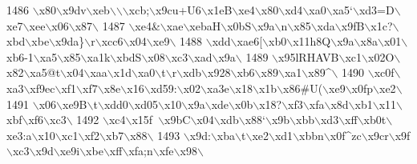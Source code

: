 \begin{DoxyCode}
{{1486 \textcolor{stringliteral}{\(\backslash\)x80\(\backslash\)x9dv\(\backslash\)xeb\(\backslash\)\(\backslash\)\(\backslash\)xcb;\(\backslash\)x9cu+U6\(\backslash\)x1eB\(\backslash\)xe4\(\backslash\)x80\(\backslash\)xd4\(\backslash\)xa0\(\backslash\)xa5`\(\backslash\)xd3=D\(\backslash\)xe7\(\backslash\)xee\(\backslash\)x06\(\backslash\)x87\(\backslash\)}
1487 \textcolor{stringliteral}{\(\backslash\)xe4&\(\backslash\)xae\(\backslash\)xebaH\(\backslash\)x0bS\(\backslash\)x9a\(\backslash\)n\(\backslash\)x85\(\backslash\)xda\(\backslash\)x9fB\(\backslash\)x1c?\(\backslash\)xbd\(\backslash\)xbe\(\backslash\)x9da\}\(\backslash\)r\(\backslash\)xcc6\(\backslash\)x04\(\backslash\)xe9\(\backslash\)}
1488 \textcolor{stringliteral}{\(\backslash\)xdd\(\backslash\)xae6[\(\backslash\)xb0\(\backslash\)x11h8Q\(\backslash\)x9a\(\backslash\)x8a\(\backslash\)x01\(\backslash\)xb6-1\(\backslash\)xa5\(\backslash\)x85\(\backslash\)xa1k\(\backslash\)xbdS\(\backslash\)x08\(\backslash\)xc3\(\backslash\)xad\(\backslash\)x9a\(\backslash\)}
1489 \textcolor{stringliteral}{\(\backslash\)x95lRHAVB\(\backslash\)xc1\(\backslash\)x02O\(\backslash\)x82\(\backslash\)xa5@t\(\backslash\)x04\(\backslash\)xaa\(\backslash\)x1d\(\backslash\)xa0\(\backslash\)t\(\backslash\)r\(\backslash\)xdb\(\backslash\)x928\(\backslash\)xb6\(\backslash\)x89\(\backslash\)xa1\(\backslash\)x89^\(\backslash\)}
1490 \textcolor{stringliteral}{\(\backslash\)xc0f\(\backslash\)xa3\(\backslash\)xf9ec\(\backslash\)xf1\(\backslash\)xf7\(\backslash\)x8e\(\backslash\)x16\(\backslash\)xd59:\(\backslash\)x02\(\backslash\)xa3e\(\backslash\)x18\(\backslash\)x1b\(\backslash\)x86#U(\(\backslash\)xe9\(\backslash\)x0fp\(\backslash\)xe2\(\backslash\)}
1491 \textcolor{stringliteral}{\(\backslash\)x06\(\backslash\)xe9B\(\backslash\)t\(\backslash\)xdd0\(\backslash\)xd05\(\backslash\)x10\(\backslash\)x9a\(\backslash\)xde\(\backslash\)x0b\(\backslash\)x18?\(\backslash\)xf3\(\backslash\)xfa\(\backslash\)x8d\(\backslash\)xb1\(\backslash\)x11\(\backslash\)xbf\(\backslash\)xf6\(\backslash\)xc3\(\backslash\)}
1492 \textcolor{stringliteral}{\(\backslash\)xc4\(\backslash\)x15f~\(\backslash\)x9bC\(\backslash\)x04\(\backslash\)xdb\(\backslash\)x88`\(\backslash\)x9b\(\backslash\)xbb\(\backslash\)xd3\(\backslash\)xff\(\backslash\)xb0t\(\backslash\)xe3:a\(\backslash\)x10\(\backslash\)xc1\(\backslash\)xf2\(\backslash\)xb7\(\backslash\)x88\(\backslash\)}
1493 \textcolor{stringliteral}{\(\backslash\)x9d:\(\backslash\)xba\(\backslash\)t\(\backslash\)xe2\(\backslash\)xd1\(\backslash\)xbbn\(\backslash\)x0f^zc\(\backslash\)x9cr\(\backslash\)x9f\(\backslash\)xc3\(\backslash\)x9d\(\backslash\)xe9i\(\backslash\)xbe\(\backslash\)xff\(\backslash\)xfa;n\(\backslash\)xfe\(\backslash\)x98\(\backslash\)}
}}
\end{DoxyCode}

